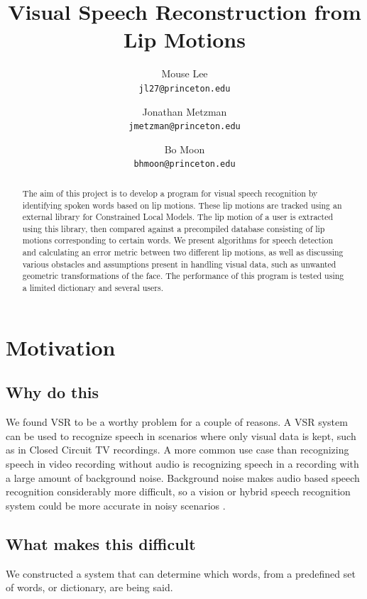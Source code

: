 \documentclass[10pt,twocolumn,letterpaper]{article}
\begin{document}
\title{Visual Speech Reconstruction from Lip Motions}

\author{Mouse Lee\\
{\tt\small jl27@princeton.edu}
\and
Jonathan Metzman\\
{\tt\small jmetzman@princeton.edu}
\and
Bo Moon\\
{\tt\small bhmoon@princeton.edu}
}

\maketitle

\begin{abstract}
  The aim of this project is to develop a program for visual speech recognition by identifying spoken words based on lip motions. These lip motions are tracked using an external library for Constrained Local Models. The lip motion of a user is extracted using this library, then compared against a precompiled database consisting of lip motions corresponding to certain words. We present algorithms for speech detection and calculating an error metric between two different lip motions, as well as discussing various obstacles and assumptions present in handling visual data, such as unwanted geometric transformations of the face. The performance of this program is tested using a limited dictionary and several users.
\end{abstract}

\section{Motivation}
\subsection{Why do this}
We found VSR to be a worthy problem for a couple of reasons. A VSR system can be used to recognize speech in scenarios where only visual data is kept, such as in Closed Circuit TV recordings. A more common use case than recognizing speech in video recording without audio is recognizing speech in a recording with a large amount of background noise. Background noise makes audio based speech recognition considerably more difficult, so a vision or hybrid speech recognition system could be more accurate in noisy scenarios \cite{Dupont}.

\subsection{What makes this difficult}
We constructed a system that can determine which words, from a predefined set of words, or dictionary, are being said.
\end{document}
